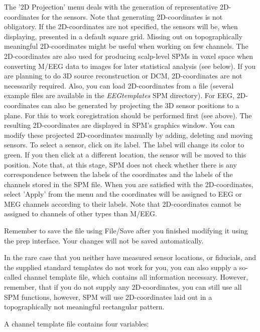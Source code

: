 The '2D Projection' menu deals with the generation of representative
2D-coordinates for the sensors. Note that generating 2D-coordinates is
not 
obligatory. If the 2D-coordinates are not specified, the sensors will
be, when displaying, presented in a default square grid. Missing out
on topographically meaningful 2D-coordinates might be useful when
working on few channels. The 2D-coordinates are also used for
producing scalp-level SPMs in voxel space when converting M/EEG data
to images for later statistical analysis (see below). If you are 
planning to do 3D source reconstruction or 
DCM, 2D-coordinates are not necessarily required. Also, you can load
2D-coordinates from a file (several example files are available in
the \textit{EEGtemplates} SPM directory). For EEG, 2D-coordinates can also
be generated by projecting the 3D sensor positions to a plane. For
this to work coregistration should be performed first (see
above). The resulting 2D-coordinates are displayed in SPM's graphics 
window. You can modify these projected 2D-coordinates
manually by adding, deleting and moving sensors. To select a sensor,
click on its label. The label will change its color to green. If
you then click at a different location, the sensor will be
moved to this position. Note that, at this stage, SPM does not
check whether there is any correspondence between the labels of the
coordinates and the labels of the channels stored in the SPM
file. When you are satisfied with the 2D-coordinates, select 'Apply'  
from the menu and the coordinates will be assigned to EEG or MEG
channels according to their labels. Note that 2D-coordinates cannot 
be assigned to channels of other types than M/EEG.  

Remember to save the file using File/Save after you finished modifying
it using the prep interface. Your changes will not be saved
automatically.

In the rare case that you neither have measured sensor locations,
or fiducials, and the supplied standard templates do not work for you,
you can also supply a so-called channel template file, which contains
all information necessary. However, remember, that if you do not
supply any 2D-coordinates, you can still use all SPM functions,
however, SPM will use 2D-coordinates laid out in a topographically not 
meaningful rectangular pattern.

A channel template file contains four variables:\\

